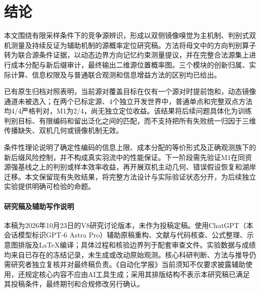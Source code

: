 \section{结论}
本文围绕有限采样条件下的竞争源辨识，形成以双侧镜像嗅觉为主机制、判别式双机测量及持续反证为辅助机制的源概率定位研究稿。方法将母文中的方向判别算子转为联合源条件证据，以动态边界方向记忆约束测量提议，并在完整合法源集上进行成本分配与新后缀审计，最终输出二维源位置概率图。三个模块的创新归属、实际计算、信息权限及与普通联合观测和信息增益方法的区别均已给出。

已有原生归档对照表明，当前源对覆盖目标在仅有一个源对时提前饱和，动态镜像通道未被选入；在两个已标定源、4个独立开发世界中，普通单点和完整双点方法均4/4严格判对，M1为2/4，尚无独立定位收益。该结果将后续问题具体化为训练判别目标、有限编码和留出泛化之间的匹配，而不支持把所有失败统一归因于三维传播缺失、双机几何或镜像机制无效。

条件性理论说明了确定性编码的信息上限、成本分配的等价形式及正确观测族下的新后缀风险控制，并不构成真实羽流中的性能保证。下一阶段需先验证M1在同资源强基线之上的判别或样本效率收益，再开展双机主动几何、错误假设恢复和湖岸迁移。本文保留现有失败结果，将完整方法设计与实际验证状态分开，为后续独立实验提供明确可检验的命题。

\paragraph{研究稿及辅助写作说明}
本稿为2026年10月23日的V8研究讨论版本，未作为投稿定稿。使用ChatGPT（本会话模型标识GPT-6 Astra Pro）辅助原稿重构、文献与代码核查、公式整理、示意图排版及LaTeX编译；具体过程和核验边界列于配套审查文件。实验数据与成绩均来自已存在的冻结记录，未生成或改动原始观测。核心科研判断、方法与推导仍需研究者独立复核并对最终稿负责。《自动化学报》当前须知不仅要求披露辅助使用，还规定核心内容不应由AI工具生成；采用其排版结构不表示本研究稿已满足其投稿条件，最终期刊和合规修改另行确认。
